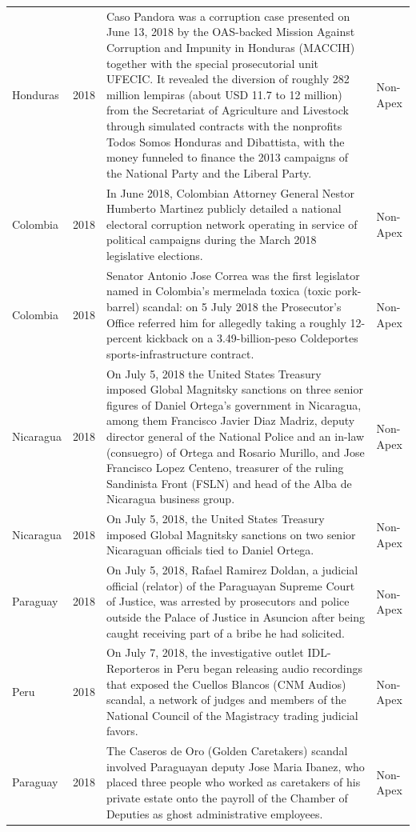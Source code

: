 \begin{landscape}
\begin{longtable}{@{}l c p{15.5cm} l@{}}
Honduras & 2018 & Caso Pandora was a corruption case presented on June 13, 2018 by the OAS-backed Mission Against Corruption and Impunity in Honduras (MACCIH) together with the special prosecutorial unit UFECIC. It revealed the diversion of roughly 282 million lempiras (about USD 11.7 to 12 million) from the Secretariat of Agriculture and Livestock through simulated contracts with the nonprofits Todos Somos Honduras and Dibattista, with the money funneled to finance the 2013 campaigns of the National Party and the Liberal Party. & Non-Apex \\
Colombia & 2018 & In June 2018, Colombian Attorney General Nestor Humberto Martinez publicly detailed a national electoral corruption network operating in service of political campaigns during the March 2018 legislative elections. & Non-Apex \\
Colombia & 2018 & Senator Antonio Jose Correa was the first legislator named in Colombia's mermelada toxica (toxic pork-barrel) scandal: on 5 July 2018 the Prosecutor's Office referred him for allegedly taking a roughly 12-percent kickback on a 3.49-billion-peso Coldeportes sports-infrastructure contract. & Non-Apex \\
Nicaragua & 2018 & On July 5, 2018 the United States Treasury imposed Global Magnitsky sanctions on three senior figures of Daniel Ortega's government in Nicaragua, among them Francisco Javier Diaz Madriz, deputy director general of the National Police and an in-law (consuegro) of Ortega and Rosario Murillo, and Jose Francisco Lopez Centeno, treasurer of the ruling Sandinista Front (FSLN) and head of the Alba de Nicaragua business group. & Non-Apex \\
Nicaragua & 2018 & On July 5, 2018, the United States Treasury imposed Global Magnitsky sanctions on two senior Nicaraguan officials tied to Daniel Ortega. & Non-Apex \\
Paraguay & 2018 & On July 5, 2018, Rafael Ramirez Doldan, a judicial official (relator) of the Paraguayan Supreme Court of Justice, was arrested by prosecutors and police outside the Palace of Justice in Asuncion after being caught receiving part of a bribe he had solicited. & Non-Apex \\
Peru & 2018 & On July 7, 2018, the investigative outlet IDL-Reporteros in Peru began releasing audio recordings that exposed the Cuellos Blancos (CNM Audios) scandal, a network of judges and members of the National Council of the Magistracy trading judicial favors. & Non-Apex \\
Paraguay & 2018 & The Caseros de Oro (Golden Caretakers) scandal involved Paraguayan deputy Jose Maria Ibanez, who placed three people who worked as caretakers of his private estate onto the payroll of the Chamber of Deputies as ghost administrative employees. & Non-Apex \\

\end{longtable}
\end{landscape}
